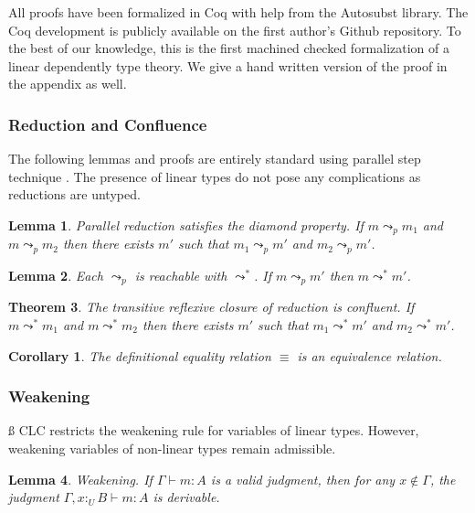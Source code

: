 \documentclass[sigplan,screen]{acmart}
\newtheorem{theorem}{Theorem}[section]
\newtheorem{corollary}{Corollary}[theorem]
\newtheorem{lemma}[theorem]{Lemma}
\theoremstyle{definition}
\newcommand{\utype}{:_{\scriptscriptstyle U}}
\newcommand{\step}{\leadsto}
\newcommand{\pstep}{\leadsto}
\begin{document}
  All proofs have been formalized in Coq with help from the Autosubst \cite{autosubst} library. The Coq development is publicly available on the first author's Github repository. To the best of our knowledge, this is the first machined checked formalization of a linear dependently type theory. We give a hand written version of the proof in the appendix as well.

  \subsubsection{Reduction and Confluence}

  The following lemmas and proofs are entirely standard using parallel step technique \cite{takahashi}. The presence of linear types do not pose any complications as reductions are untyped.

  \begin{lemma} 
    Parallel reduction satisfies the diamond property. If $m \pstep_p m_1$ and $m \pstep_p m_2$ then there exists $m'$ such that $m_1 \pstep_p m'$ and $m_2 \pstep_p m'$.
  \end{lemma}

  \begin{lemma} 
    Each $\pstep_p$ is reachable with $\step^*$. If $m \pstep_p m'$ then $m \step^* m'$.
  \end{lemma}

  \begin{theorem} 
    The transitive reflexive closure of reduction is confluent. If $m \step^* m_1$ and $m \step^* m_2$ then there exists $m'$ such that $m_1 \pstep^* m'$ and $m_2 \pstep^* m'$.
  \end{theorem}

  \begin{corollary}
    The definitional equality relation $\equiv$ is an equivalence relation.
  \end{corollary}

  \subsubsection{Weakening} \label{weakening}ß
  CLC restricts the weakening rule for variables of linear types. However, weakening variables of non-linear types remain admissible.

  \begin{lemma} 
    Weakening. If $\Gamma \vdash m : A$ is a valid judgment, then for any $x \notin \Gamma$, the judgment $\Gamma, x \utype B \vdash m : A$ is derivable.
  \end{lemma}
\end{document}
